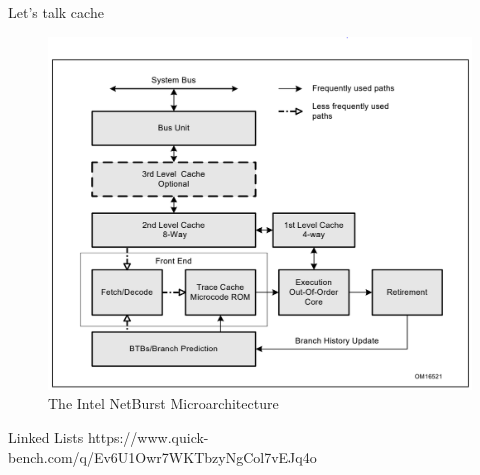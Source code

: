 \documentclass[11pt]{beamer}
\begin{document}
\begin{frame}
Let's talk cache
\begin{figure}[hbtp]
\centering
\includegraphics[scale=.3]{netburst.png}
\caption{The Intel NetBurst Microarchitecture}
\end{figure}

\end{frame}

\begin{frame}{Linked Lists}
https://www.quick-bench.com/q/Ev6U1Owr7WKTbzyNgCol7vEJq4o
\end{frame}
\end{document}
